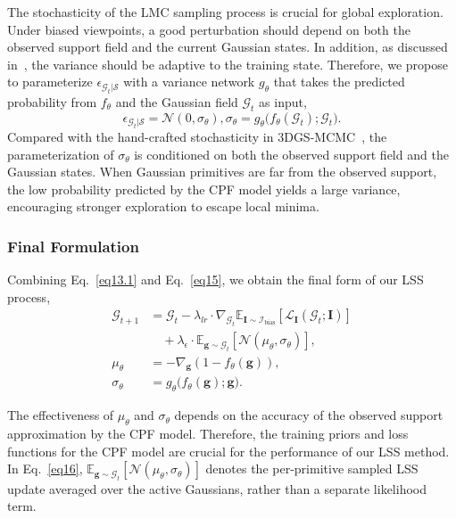 \documentclass[lettersize,journal]{IEEEtran}
\begin{document}
The stochasticity of the LMC sampling process is crucial for global exploration. 
Under biased viewpoints, a good perturbation should depend on both the observed support field and the current Gaussian states. 
In addition, as discussed in~\cite{sgld2}, the variance should be adaptive to the training state. Therefore, we propose to parameterize $\epsilon_{\mathcal{G}_t \vert \mathcal{S}}$ with a variance network $g_{\theta}$ that takes the predicted probability from $f_{\theta}$ and the Gaussian field $\mathcal{G}_t$ as input,
\begin{equation}
    \epsilon_{\mathcal{G}_t \vert \mathcal{S}} = \mathcal{N} (0, \sigma_{\theta}), \sigma_{\theta} = g_{\theta}\big(f_{\theta}(\mathcal{G}_t); \mathcal{G}_t\big).
    \label{eq15}
\end{equation}
Compared with the hand-crafted stochasticity in 3DGS-MCMC~\cite{mcmc}, the parameterization of $\sigma_{\theta}$ is conditioned on both the observed support field and the Gaussian states. When Gaussian primitives are far from the observed support, the low probability predicted by the CPF model yields a large variance, encouraging stronger exploration to escape local minima.

\subsubsection{Final Formulation}

Combining Eq.~\ref{eq13.1} and Eq.~\ref{eq15}, we obtain the final form of our LSS process, 
\begin{align}
    \mathcal{G}_{t+1} &= \mathcal{G}_t - \lambda_{lr} \cdot \nabla_{\mathcal{G}_t} \mathbb{E}_{\mathbf{I} \sim \mathcal{I}_{\text{bias}}} \left[ \mathcal{L}_{\mathbf{I}} \left( \mathcal{G}_t; \mathbf{I}\right) \right] \nonumber\\
        &\quad + \lambda_{\epsilon} \cdot \mathbb{E}_{\mathbf{g} \sim \mathcal{G}_t} \left[ \mathcal{N}(\mu_{\theta}, \sigma_{\theta}) \right], \label{eq16}\\
    \mu_{\theta} &= -  \nabla_{\mathbf{g}}  \left( 1 -  f_{\theta}( \mathbf{g} ) \right), \label{eq17}\\
    \sigma_{\theta} &= g_{\theta}\big(f_{\theta}(\mathbf{g}); \mathbf{g}\big). \label{eq18}
\end{align}

The effectiveness of $\mu_{\theta}$ and $\sigma_{\theta}$ depends on the accuracy of the observed support approximation by the CPF model. Therefore, the training priors and loss functions for the CPF model are crucial for the performance of our LSS method.
In Eq.~\ref{eq16}, $\mathbb{E}_{\mathbf{g} \sim \mathcal{G}_t}[\mathcal{N}(\mu_{\theta}, \sigma_{\theta})]$ denotes the per-primitive sampled LSS update averaged over the active Gaussians, rather than a separate likelihood term.
\end{document}
